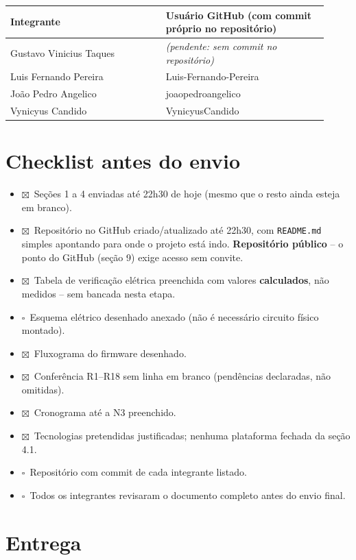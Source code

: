 \documentclass[11pt,a4paper]{article}
\newcommand{\vazio}{$\square$}
\newcommand{\marcado}{$\boxtimes$}
\newcommand{\cod}[1]{\texttt{#1}}
\begin{document}
\begin{longtable}{|p{0.45\linewidth}|p{0.47\linewidth}|}
\hline
\textbf{Integrante} & \textbf{Usuário GitHub (com commit próprio no repositório)} \\ \hline
Gustavo Vinicius Taques & \textit{(pendente: sem commit no repositório)} \\ \hline
Luis Fernando Pereira & Luis-Fernando-Pereira \\ \hline
João Pedro Angelico & joaopedroangelico \\ \hline
Vynicyus Candido & VynicyusCandido \\ \hline
\end{longtable}

\section*{Checklist antes do envio}

\begin{itemize}[label={}, leftmargin=1.5em]
\item \marcado\ Seções 1 a 4 enviadas até 22h30 de hoje (mesmo que o resto ainda esteja em branco).
\item \marcado\ Repositório no GitHub criado/atualizado até 22h30, com \cod{README.md} simples apontando
  para onde o projeto está indo. \textbf{Repositório público} -- o ponto do GitHub (seção 9)
  exige acesso sem convite.
\item \marcado\ Tabela de verificação elétrica preenchida com valores \textbf{calculados}, não medidos -- sem
  bancada nesta etapa.
\item \vazio\ Esquema elétrico desenhado anexado (não é necessário circuito físico montado).
\item \marcado\ Fluxograma do firmware desenhado.
\item \marcado\ Conferência R1--R18 sem linha em branco (pendências declaradas, não omitidas).
\item \marcado\ Cronograma até a N3 preenchido.
\item \marcado\ Tecnologias pretendidas justificadas; nenhuma plataforma fechada da seção 4.1.
\item \vazio\ Repositório com commit de cada integrante listado.
\item \vazio\ Todos os integrantes revisaram o documento completo antes do envio final.
\end{itemize}

\section*{Entrega}
\end{document}
